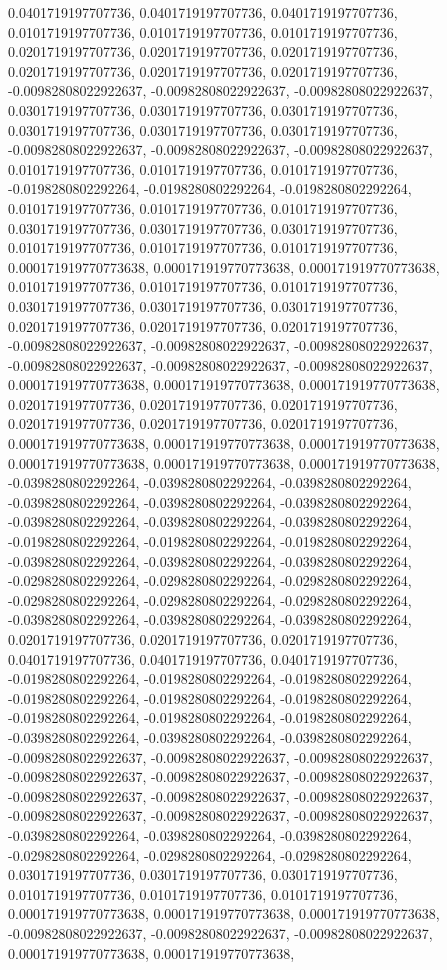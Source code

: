\documentclass[
  ,man]{apa6}
\begin{document}
0.0401719197707736, 0.0401719197707736, 0.0401719197707736, 0.0101719197707736, 0.0101719197707736, 0.0101719197707736, 0.0201719197707736, 0.0201719197707736, 0.0201719197707736, 0.0201719197707736, 0.0201719197707736, 0.0201719197707736, -0.00982808022922637, -0.00982808022922637, -0.00982808022922637, 0.0301719197707736, 0.0301719197707736, 0.0301719197707736, 0.0301719197707736, 0.0301719197707736, 0.0301719197707736, -0.00982808022922637, -0.00982808022922637, -0.00982808022922637, 0.0101719197707736,
0.0101719197707736, 0.0101719197707736, -0.0198280802292264, -0.0198280802292264, -0.0198280802292264, 0.0101719197707736, 0.0101719197707736, 0.0101719197707736, 0.0301719197707736, 0.0301719197707736, 0.0301719197707736, 0.0101719197707736, 0.0101719197707736, 0.0101719197707736, 0.000171919770773638, 0.000171919770773638, 0.000171919770773638, 0.0101719197707736, 0.0101719197707736, 0.0101719197707736, 0.0301719197707736, 0.0301719197707736, 0.0301719197707736, 0.0201719197707736, 0.0201719197707736,
0.0201719197707736, -0.00982808022922637, -0.00982808022922637, -0.00982808022922637, -0.00982808022922637, -0.00982808022922637, -0.00982808022922637, 0.000171919770773638, 0.000171919770773638, 0.000171919770773638, 0.0201719197707736, 0.0201719197707736, 0.0201719197707736, 0.0201719197707736, 0.0201719197707736, 0.0201719197707736, 0.000171919770773638, 0.000171919770773638, 0.000171919770773638, 0.000171919770773638, 0.000171919770773638, 0.000171919770773638, -0.0398280802292264, -0.0398280802292264,
-0.0398280802292264, -0.0398280802292264, -0.0398280802292264, -0.0398280802292264, -0.0398280802292264, -0.0398280802292264, -0.0398280802292264, -0.0198280802292264, -0.0198280802292264, -0.0198280802292264, -0.0398280802292264, -0.0398280802292264, -0.0398280802292264, -0.0298280802292264, -0.0298280802292264, -0.0298280802292264, -0.0298280802292264, -0.0298280802292264, -0.0298280802292264, -0.0398280802292264, -0.0398280802292264, -0.0398280802292264, 0.0201719197707736, 0.0201719197707736,
0.0201719197707736, 0.0401719197707736, 0.0401719197707736, 0.0401719197707736, -0.0198280802292264, -0.0198280802292264, -0.0198280802292264, -0.0198280802292264, -0.0198280802292264, -0.0198280802292264, -0.0198280802292264, -0.0198280802292264, -0.0198280802292264, -0.0398280802292264, -0.0398280802292264, -0.0398280802292264, -0.00982808022922637, -0.00982808022922637, -0.00982808022922637, -0.00982808022922637, -0.00982808022922637, -0.00982808022922637, -0.00982808022922637, -0.00982808022922637,
-0.00982808022922637, -0.00982808022922637, -0.00982808022922637, -0.00982808022922637, -0.0398280802292264, -0.0398280802292264, -0.0398280802292264, -0.0298280802292264, -0.0298280802292264, -0.0298280802292264, 0.0301719197707736, 0.0301719197707736, 0.0301719197707736, 0.0101719197707736, 0.0101719197707736, 0.0101719197707736, 0.000171919770773638, 0.000171919770773638, 0.000171919770773638, -0.00982808022922637, -0.00982808022922637, -0.00982808022922637, 0.000171919770773638, 0.000171919770773638,
\end{document}

